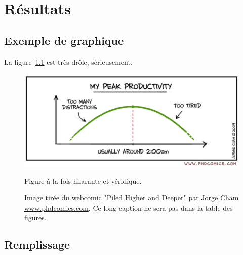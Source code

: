 \chapter{Résultats}


\section{Exemple de graphique}

La figure~\ref{fig:phdcomics} est très drôle, sérieusement.

\begin{figure}[htb]
    \begin{center}
        \includegraphics[width=0.8\columnwidth]{Figures/phd083109s.pdf} 
        \caption{Figure à la fois hilarante et véridique.}
        \label{fig:phdcomics}
        \vspace{-10pt}
        \caption*{ Image tirée du webcomic "Piled Higher and Deeper" par Jorge Cham
                   \href{www.phdcomics.com}{www.phdcomics.com}. 
                   Ce long caption ne sera pas dans la table des figures.
                 }
    \end{center}
\end{figure}

\section{Remplissage}
\kant[11-14]
